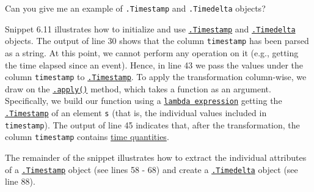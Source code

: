 \documentclass[a4paper,11pt]{book}
\newcommand{\question}[1]{%
    \begin{tcolorbox}[colback=comp_c!10,colframe=comp_c,sidebyside align=top,width=\linewidth,before skip=1ex]
        #1
    \end{tcolorbox}
    \switchcolumn%
}
\newcommand{\note}[1]{%
    \begin{tcolorbox}[colback=white!0,colframe=white!10,width=\linewidth,before skip=1ex]
        #1
    \end{tcolorbox}
}
\begin{document}
\begin{paracol}{2}
	\question{\raggedright Can you give me an example of \texttt{.Timestamp} and \texttt{.Timedelta} objects?}
	\note{Snippet 6.11 illustrates how to initialize and use \href{https://pandas.pydata.org/docs/reference/api/pandas.Timestamp.html}{\texttt{.Timestamp}} and \href{https://pandas.pydata.org/docs/reference/api/pandas.Timedelta.html}{\texttt{.Timedelta}} objects. The output of line 30 shows that the column \texttt{timestamp} has been parsed as a string. At this point, we cannot perform any operation on it (e.g., getting the time elapsed since an event). Hence, in line 43 we pass the values under the column \texttt{timestamp} to \href{https://pandas.pydata.org/docs/reference/api/pandas.Timestamp.html}{\texttt{.Timestamp}}. To apply the transformation column-wise, we draw on the \href{https://pandas.pydata.org/docs/reference/api/pandas.DataFrame.apply.html}{\texttt{.apply()}} method, which takes a function as an argument. Specifically, we build our function using a \href{https://docs.python.org/3/tutorial/controlflow.html}{\texttt{lambda expression}} getting the \href{https://pandas.pydata.org/docs/reference/api/pandas.Timestamp.html}{\texttt{.Timestamp}} of an element \texttt{s} (that is, the individual values included in \texttt{timestamp}). The output of line 45 indicates that, after the transformation, the column \texttt{timestamp} contains \href{https://docs.python.org/3/library/datetime.html}{time quantities}.
	
	\quad The remainder of the snippet illustrates how to extract the individual attributes of a \href{https://pandas.pydata.org/docs/reference/api/pandas.Timestamp.html}{\texttt{.Timestamp}} object (see lines 58 - 68) and create a \href{https://pandas.pydata.org/docs/reference/api/pandas.Timedelta.html}{\texttt{.Timedelta}} object (see line 88).
	}
\end{paracol}
\end{document}
